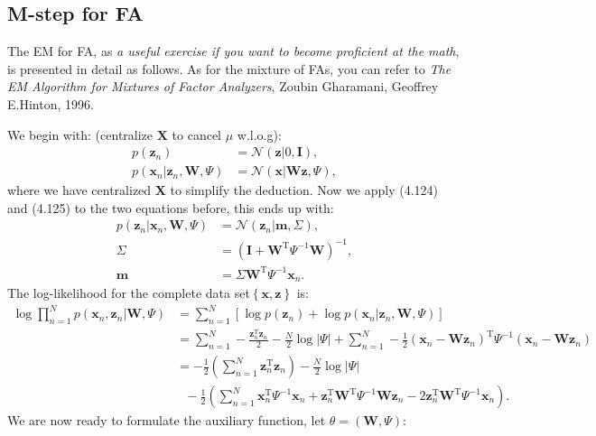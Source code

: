 \documentclass[UTF8]{ctexart}
\begin{document}
\subsection{M-step for FA}
The EM for FA, as \emph{a useful exercise if you want to become proficient at the math}, is presented in detail as follows.
As for the mixture of FAs, you can refer to \emph{The EM Algorithm for Mixtures of Factor Analyzers}, Zoubin Gharamani, Geoffrey E.Hinton, 1996.

We begin with: (centralize $\textbf{X}$ to cancel $\mu$ w.l.o.g):
$$
\begin{aligned}
p(\textbf{z}_{n})&=\mathcal{N}(\textbf{z}|0,\textbf{I}),\\
p(\textbf{x}_{n}|\textbf{z}_{n},\textbf{W},\Psi)&=\mathcal{N}(\textbf{x}|\textbf{W}\textbf{z},\Psi),
\end{aligned}
$$
where we have centralized $\textbf{X}$ to simplify the deduction.
Now we apply (4.124) and (4.125) to the two equations before, this ends up with:
$$
\begin{aligned}
p(\textbf{z}_{n}|\textbf{x}_{n},\textbf{W},\Psi)&=\mathcal{N}(\textbf{z}_{n}|\textbf{m},\Sigma),\\
\Sigma&=(\textbf{I}+\textbf{W}^{\text{T}}\Psi^{-1}\textbf{W})^{-1},\\
\textbf{m}&=\Sigma\textbf{W}^{\text{T}}\Psi^{-1}\textbf{x}_{n}.
\end{aligned}
$$
The log-likelihood for the complete data set$\left\{ \textbf{x},\textbf{z} \right\}$ is:
$$
\begin{aligned}
\log \prod_{n=1}^{N}p(\textbf{x}_{n},\textbf{z}_{n}|\textbf{W},\Psi)&=\sum_{n=1}^{N}\left[\log p(\textbf{z}_{n})+\log p(\textbf{x}_{n}|\textbf{z}_{n},\textbf{W},\Psi)\right]\\
&=\sum_{n=1}^{N}-\frac{\textbf{z}_{n}^{\text{T}}\textbf{z}_{n}}{2}-\frac{N}{2}\log |\Psi|+\sum_{n=1}^{N}-\frac{1}{2}\left(\textbf{x}_{n}-\textbf{W}\textbf{z}_{n}\right)^{\text{T}}\Psi^{-1}\left(\textbf{x}_{n}-\textbf{W}\textbf{z}_{n}\right)\\
&=-\frac{1}{2}\left(\sum_{n=1}^{N}\textbf{z}_{n}^{\text{T}}\textbf{z}_{n}\right)-\frac{N}{2}\log|\Psi|\\
&\ \ \ -\frac{1}{2}\left(\sum_{n=1}^{N}\textbf{x}_{n}^{\text{T}}\Psi^{-1}\textbf{x}_{n}+\textbf{z}_{n}^{\text{T}}\textbf{W}^{\text{T}}\Psi^{-1}\textbf{W}\textbf{z}_{n}-2\textbf{z}_{n}^{\text{T}}\textbf{W}^{\text{T}}\Psi^{-1}\textbf{x}_{n} \right).
\end{aligned}
$$
We are now ready to formulate the auxiliary function, let $\theta=(\textbf{W},\Psi)$:
\end{document}
